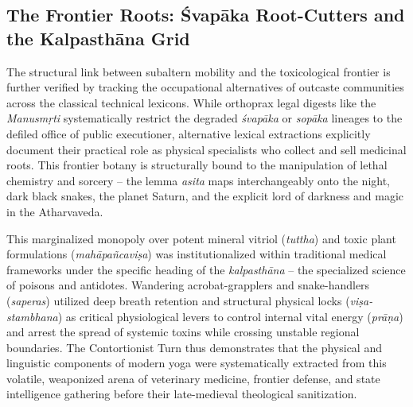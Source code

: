 \documentclass[11pt,twoside,letterpaper]{article}
\begin{document}
\subsection{The Frontier Roots: \'{S}vap\={a}ka Root-Cutters and the Kalpasth\={a}na Grid}
The structural link between subaltern mobility and the toxicological frontier is further verified by tracking the occupational alternatives of outcaste communities across the classical technical lexicons. While orthoprax legal digests like the \textit{Manusm\d{r}ti} systematically restrict the degraded \textit{\'svap\={a}ka} or \textit{sop\={a}ka} lineages to the defiled office of public executioner, alternative lexical extractions explicitly document their practical role as physical specialists who collect and sell medicinal roots. This frontier botany is structurally bound to the manipulation of lethal chemistry and sorcery – the lemma \textit{asita} maps interchangeably onto the night, dark black snakes, the planet Saturn, and the explicit lord of darkness and magic in the Atharvaveda.

This marginalized monopoly over potent mineral vitriol (\textit{tuttha}) and toxic plant formulations (\textit{mah\={a}pa\~{n}cavi\d{s}a}) was institutionalized within traditional medical frameworks under the specific heading of the \textit{kalpasth\={a}na} – the specialized science of poisons and antidotes. Wandering acrobat-grapplers and snake-handlers (\textit{saperas}) utilized deep breath retention and structural physical locks (\textit{vi\d{s}a-stambhana}) as critical physiological levers to control internal vital energy (\textit{pr\={a}\d{n}a}) and arrest the spread of systemic toxins while crossing unstable regional boundaries. The Contortionist Turn thus demonstrates that the physical and linguistic components of modern yoga were systematically extracted from this volatile, weaponized arena of veterinary medicine, frontier defense, and state intelligence gathering before their late-medieval theological sanitization.
\end{document}
